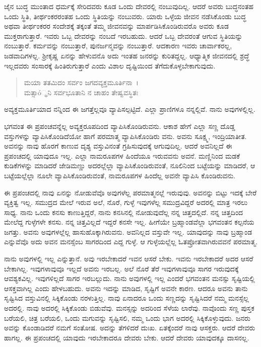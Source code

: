 ಜೈನ ಬುದ್ಧ ಮುಂತಾದ ಧರ್ಮಕ್ಕೆ ಸೇರಿದವರು ಕೂಡ ಒಂದು ದೇವರಲ್ಲಿ ನಂಬುವುದಿಲ್ಲ. ಆದರೆ ಅವರು ಬುದ್ಧನಂತಹ ಒಂದು ಸ್ಥಿತಿ, ತೀರ್ಥಂಕರರಂತಹ ಒಂದು ಸ್ಥಿತಿಯನ್ನು ನಂಬುವರು. ಯಾರು ಒಳ್ಳೆಯ ಜೀವನ ನಡೆಸಿಕೊಂಡು ಬುದ್ಧ ಅಥವಾ ತೀರ್ಥಂಕರರ ಸಂದೇಶಕ್ಕೆ ತಕ್ಕಂತೆ ತಮ್ಮ ಜೀವನವನ್ನು ಮಾರ್ಪಡಿಸಿಕೊಂಡಿರುವರೊ ಅವರು ಕೂಡ ಮುಕ್ತರಾಗುತ್ತಾರೆ. ಇವರು ಒಬ್ಬ ದೇವರನ್ನು ನಂಬದೆ ಇರಬಹುದು. ಆದರೆ ಒಬ್ಬ ದೇವರಂತೆ ಆಗುವ ಸ್ಥಿತಿಯನ್ನು ನಂಬುತ್ತಾರೆ. ಕರ್ಮವನ್ನು ನಂಬುತ್ತಾರೆ, ಪುನರ್ಜನ್ಮವನ್ನು ನಂಬುತ್ತಾರೆ. ಆದಕಾರಣ ಇವರು ಚಾರ್ವಾಕರಲ್ಲ, ಜಡವಾದಿಗಳಲ್ಲ. ಶ‍್ರೀಕೃಷ್ಣ ಏನನ್ನು ಹೇಳುವನೊ ಅದು ಇಂತಹ ಜನರನ್ನು ಕುರಿತದ್ದಲ್ಲ. ಆಧ್ಯಾತ್ಮಿಕ ಜೀವನದಲ್ಲಿ ಶ್ರದ್ಧೆ ಇಲ್ಲದವರು ಸಂಸಾರಕ್ಕೆ ಹಿಂತಿರುಗುತ್ತಾರೆ ಎಂದು ವಿಶಾಲ ದೃಷ್ಟಿಯಿಂದ ತೆಗೆದುಕೊಳ್ಳಬೇಕಾಗುವುದು.

\begin{verse}
ಮಯಾ ತತಮಿದಂ ಸರ್ವಂ ಜಗದವ್ಯಕ್ತಮೂರ್ತಿನಾ~।\\ಮತ್ಸಾó್ಥನಿ ಸರ್ವಭೂತಾನಿ ನ ಚಾಹಂ ತೇಷ್ವವಸ್ಥಿತಃ 
\end{verse}

{\small ಅವ್ಯಕ್ತಮೂರ್ತಿಯಾದ ನನ್ನಿಂದ ಈ ಜಗತ್ತೆಲ್ಲವೂ ವ್ಯಾಪಿಸಲ್ಪಟ್ಟಿದೆ. ಎಲ್ಲಾ ಪ್ರಾಣಿಗಳೂ ನನ್ನಲ್ಲಿವೆ. ನಾನು ಅವುಗಳಲ್ಲಿಲ್ಲ.}

ಭಗವಂತ ಈ ಪ್ರಪಂಚವನ್ನೆಲ್ಲ ಅವ್ಯಕ್ತರೂಪದಿಂದ ವ್ಯಾಪಿಸಿಕೊಂಡಿರುವನು. ಆಕಾಶ ಹೇಗೆ ಎಲ್ಲಾ ಸಣ್ಣ ದೊಡ್ಡ ವಸ್ತುಗಳನ್ನು ವ್ಯಾಪಿಸಿಕೊಂಡಿದೆಯೋ ಹಾಗೆ ಪರಮಾತ್ಮ ವ್ಯಾಪಿಸಿಕೊಂಡಿರು ವನು. ಅವನು ಸೂಕ್ಷ್ಮ, ಇಂದ್ರಿಯಾತೀತ. ಅವನನ್ನು ನಾವು ಹೊರಗೆ ಕಾಣುವ ದೃಶ್ಯ ವಸ್ತುವಿನಂತೆ ಗ್ರಹಿಸುವುದಕ್ಕೆ ಆಗುವುದಿಲ್ಲ. ಆದರೆ ಅವನಿಲ್ಲದೆ ಈ ಪ್ರಪಂಚದಲ್ಲಿ ಯಾವುದೂ ಇಲ್ಲ. ಎಲ್ಲಾ ನಾಮರೂಪಗಳ ಹಿಂದೆಯೂ ಇರುವವನು ಅವನೆ. ಮಣ್ಣಿನಿಂದ ಮಡಕೆ ಕುಡಿಕೆಗಳನ್ನು ಮಾಡಿದರೆ ಜೇಡಿಮಣ್ಣು ಅದರಲ್ಲೆಲ್ಲಾ ವ್ಯಾಪಿಸಿಕೊಂಡಿರುವಂತೆ, ನೂಲಿನಿಂದ ಬಟ್ಟೆಯನ್ನು ಮಾಡಿದರೆ, ಆ ಬಟ್ಟೆಯಲ್ಲೆಲ್ಲಾ ನೂಲೇ ವ್ಯಾಪಿಸಿಕೊಂಡಿರುವಂತೆ, ನಾಮರೂಪಗಳ ಹಿಂದೆಲ್ಲ ಅವನೇ ವ್ಯಾಪಿಸಿ ಕೊಂಡಿರುವನು.

ಈ ಪ್ರಪಂಚದಲ್ಲಿ ನಾವು ಏನನ್ನು ನೋಡುವೆವೊ ಅವುಗಳೆಲ್ಲ ಪರಮಾತ್ಮನಲ್ಲೆ ಇರುವುವು. ಅವನನ್ನು ಬಿಟ್ಟು ಇದಕ್ಕೆ ಬೇರೆ ವ್ಯಕ್ತಿತ್ವ ಇಲ್ಲ. ಸಮುದ್ರದ ಮೇಲೆ ಇರುವ ಅಲೆ, ನೊರೆ, ಗುಳ್ಳೆ ಇವುಗಳೆಲ್ಲ ಸಮುದ್ರವಿದ್ದರೆ ಅದರಲ್ಲಿ ಮಾತ್ರ ಇರಲು ಸಾಧ್ಯ. ನಾನು ಒಂದು ಕನಸು ಕಾಣುತ್ತಿದ್ದರೆ, ನಾನು ಕನಸಿನಲ್ಲಿ ನೋಡುವುದೆಲ್ಲ ನನ್ನ ಚಿತ್ತದಲ್ಲಿದೆ. ನನ್ನ ಚಿತ್ತದಿಂದ ಮೇಲೆದ್ದ ಗುಳ್ಳೆಗಳೇ ಕನಸು. ನನ್ನ ಚಿತ್ತವಿಲ್ಲದೆ ಇದ್ದರೆ ಕನಸೇ ಇಲ್ಲ. ಹೀಗೆಯೇ ಬ್ರಹ್ಮಾಂಡವೆಲ್ಲಾ ಭಗವಂತನ ಕಲ್ಪನೆಯ ಜಗತ್ತು. ಅವನು ಅವುಗಳಲ್ಲೆಲ್ಲ ಹಾಸುಹೊಕ್ಕಾಗಿರುವನು. ಅವನಿಲ್ಲದ ವಸ್ತುವೇ ಇಲ್ಲ. ಯಾವುದನ್ನು ನಾವು ಬ್ರಹ್ಮಾಂಡ ಎನ್ನುವೆವೊ ಅದು ಅವನ ಮನಸ್ಸೆಂಬ ಸಾಗರದಿಂದ ಎದ್ದ ಗುಳ್ಳೆ. ಆ ಗುಳ್ಳೆಯಲ್ಲೆಲ್ಲ ಓತಪ್ರೋತವಾಗಿರುವವನೆ ಪರಮಾತ್ಮ.

ನಾನು ಅವುಗಳಲ್ಲಿ ಇಲ್ಲ ಎನ್ನುತ್ತಾನೆ. ಅವು ಇರಬೇಕಾದರೆ ಇವನ ಆಸರೆ ಬೇಕು. ಇವನು ಇರಬೇಕಾದರೆ ಅದರ ಆಸರೆ ಬೇಕಾಗಿಲ್ಲ. ಇವುಗಳಾವುವೂ ಇಲ್ಲದೆ ಅವನು ಇರಬಲ್ಲ. ಅಲೆ ನೊರೆ ತೆರೆ ಇವುಗಳಾವುವೂ ಸಾಗರ ಇರುವುದಕ್ಕೆ ಆವಶ್ಯಕವಿಲ್ಲ. ಇವುಗಳಿಲ್ಲದೆ ಸಾಗರ ಇರಬಲ್ಲುದು. ನಾನು ಅವುಗಳಲ್ಲಿ ಇಲ್ಲ ಎಂದರೆ ಭಗವಂತನ ಮನಸ್ಸು ಸೃಷ್ಟಿಯಲ್ಲಿ ಆಸಕ್ತವಾಗಿಲ್ಲ ಎಂದು ಹೇಳಬಹುದು. ಅವನು ಇದನ್ನು ಮಾಡಿದ, ಸೃಷ್ಟಿಗೆ ಅವನೇ ಕಾರಣ. ಆದರೂ ಅವನು ತಾನು ಸೃಷ್ಟಿಸಿದ ವಸ್ತುವಿನಲ್ಲಿ ಸಿಕ್ಕಿಕೊಂಡು ನರಳುತ್ತಿಲ್ಲ. ನಾವು ಏನಾದರೂ ಒಂದು ಸಣ್ಣದನ್ನು ಸೃಷ್ಟಿಸಿದರೆ ನಮ್ಮ ಮನಸ್ಸೆಲ್ಲ ಅದರಲ್ಲಿ. ನಾವು ಅದರಲ್ಲಿ ಸಿಕ್ಕಿಕೊಂಡು ಬಿಡುವೆವು. ಮನಸ್ಸನ್ನು ಅದರಿಂದ ಸೆಳೆಯ ಲಾರೆವು. ನಾವೊಂದು ಸಣ್ಣ ಪುಸ್ತಕ ಬರೆಯಲಿ, ಚಿತ್ರ ಬರೆಯಲಿ, ಒಂದು ಮಗುವನ್ನು ಸೃಷ್ಟಿಸಲಿ, ನಮ್ಮ ಒಂದು ಭಾಗ ಅದರಲ್ಲಿ ಸಿಕ್ಕಿಕೊಳ್ಳುವುದು. ಜನರು ಅವನ್ನು ಕೊಂಡಾಡಿದರೆ ನಮಗೆ ಸಂತೋಷ. ಅದನ್ನು ತೆಗಳಿದರೆ ದುಃಖ. ಏತಕ್ಕೆಂದರೆ ನಾವು ಆಸಕ್ತರು. ಆದರೆ ದೇವರು ಹಾಗಲ್ಲ. ಈ ಪ್ರಪಂಚದಲ್ಲಿ ಯಾವುದು ಇರಬೇಕಾದರೂ ದೇವರು ಬೇಕು. ಆದರೆ ದೇವರು ಯಾವುದಕ್ಕೂ ದಾಸನಲ್ಲ.

